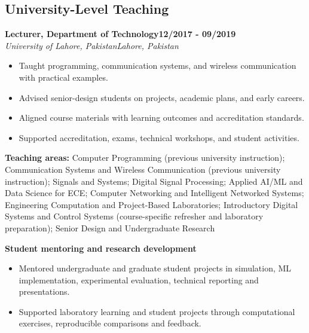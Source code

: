 \documentclass[8pt,letterpaper]{extarticle}
\newcommand{\role}[4]{%
  \Needspace{4\baselineskip}\textbf{#1}\hfill\textbf{#2}\\[-1pt]
  \textit{#3}\hfill\textit{#4}\par}
\begin{document}
\subsection{University-Level Teaching}
\role{Lecturer, Department of Technology}{12/2017 - 09/2019}{University of Lahore, Pakistan}{Lahore, Pakistan}
\begin{itemize}
\item Taught programming, communication systems, and wireless communication with practical examples.
\item Advised senior-design students on projects, academic plans, and early careers.
\item Aligned course materials with learning outcomes and accreditation standards.
\item Supported accreditation, exams, technical workshops, and student activities.
\end{itemize}
\vspace{1pt}
{\small\textbf{Teaching areas:} Computer Programming (previous university instruction); Communication Systems and Wireless Communication (previous university instruction); Signals and Systems; Digital Signal Processing; Applied AI/ML and Data Science for ECE; Computer Networking and Intelligent Networked Systems; Engineering Computation and Project-Based Laboratories; Introductory Digital Systems and Control Systems (course-specific refresher and laboratory preparation); Senior Design and Undergraduate Research}\par
{}\noindent\textbf{Student mentoring and research development}\par
\begin{itemize}
\item Mentored undergraduate and graduate student projects in simulation, ML implementation, experimental evaluation, technical reporting and presentations.
\item Supported laboratory learning and student projects through computational exercises, reproducible comparisons and feedback.
\end{itemize}
\end{document}
